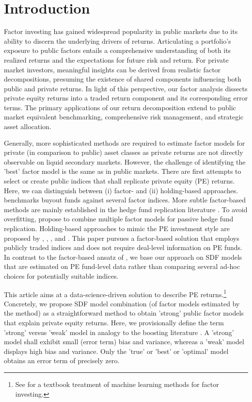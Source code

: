 \documentclass[12pt]{article}
\begin{document}
\section{Introduction}
\label{sec:factor_investing}

Factor investing has gained widespread popularity in public markets due to its ability to discern the underlying drivers of returns. 
Articulating a portfolio's exposure to public factors entails a comprehensive understanding of both its realized returns and the expectations for future risk and return. 
For private market investors, meaningful insights can be derived from realistic factor decompositions, presuming the existence of shared components influencing both public and private returns. 
In light of this perspective, our factor analysis dissects private equity returns into a traded return component and its corresponding error terms. 
The primary applications of our return decomposition extend to public market equivalent benchmarking, comprehensive risk management, and strategic asset allocation.

Generally, more sophisticated methods are required to estimate factor models for private (in comparison to public) asset classes as private returns are not directly observable on liquid secondary markets.
However, the challenge of identifying the 'best' factor model is the same as in public markets.
There are first attempts to select or create public indices that shall replicate private equity (PE) returns.
Here, we can distinguish between (i) factor- and (ii) holding-based approaches.
\cite{P14} benchmarks buyout funds against several factor indices.
More subtle factor-based methods are mainly established in the hedge fund replication literature \citep{TV08,W14}.
To avoid overfitting, \cite{OST17} propose to combine multiple factor models for passive hedge fund replication.
Holding-based approaches to mimic the PE investment style are proposed by \cite{LSSL16}, \cite{S17}, \cite{MS19}, and \cite{PP19}.
This paper pursues a factor-based solution that employs publicly traded indices and does not require deal-level information on PE funds.
In contrast to the factor-based ansatz of \cite{P14}, we base our approach on SDF models that are estimated on PE fund-level data rather than comparing several ad-hoc choices for potentially suitable indices.

This article aims at a data-science-driven solution to describe PE returns.\footnote{See \cite{CG23} for a textbook treatment of machine learning methods for factor investing.}
Concretely, we propose SDF model combination (of factor models estimated by the \cite{DLP12} method) as a straightforward method to obtain 'strong' public factor models that explain private equity returns.
Here, we provisionally define the term 'strong' versus 'weak' model in analogy to the boosting literature \citep{S90}.
A 'strong' model shall exhibit small (error term) bias and variance, whereas a 'weak' model displays high bias and variance.
Only the 'true' or 'best' or 'optimal' model obtains an error term of precisely zero.
\end{document}
